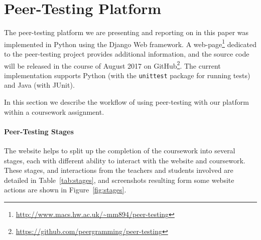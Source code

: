 \documentclass[sigplan,10pt,review]{acmart}\settopmatter{printfolios=true}
\begin{document}






\section{Peer-Testing Platform}
\label{sec:platform}

The peer-testing platform we are presenting and reporting on in this
paper was implemented in Python using the Django Web framework. A
web-page\footnote{\url{http://www.macs.hw.ac.uk/~mm894/peer-testing}}
dedicated to the peer-testing project provides additional information,
and the source code will be released in the course of August 2017 on
GitHub\footnote{\url{https://github.com/peergramming/peer-testing}}.
The current implementation supports Python (with the \texttt{unittest}
package for running tests) and Java (with JUnit).

In this section we describe the workflow of using peer-testing with
our platform within a coursework assignment.

\paragraph{Peer-Testing Stages}

The website helps to split up the completion of the coursework into
several stages, each with different ability to interact with the
website and coursework. These stages, and interactions from the
teachers and students involved are detailed in Table~\ref{tab:stages},
and screenshots resulting form some website actions are shown in
Figure~\ref{fig:stages}.
\end{document}

